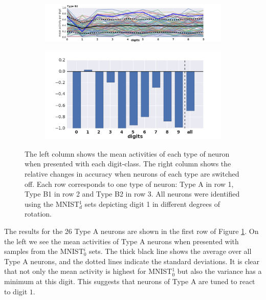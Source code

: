 \documentclass[10pt,a4paper]{article}
\begin{document}
\begin{figure}
\hfill
 \centering
\begin{subfigure}{.7\textwidth}
  \centering
  \includegraphics[width=1\linewidth]{activity_il_digit1_lay4_mnist.png}
\end{subfigure}%
\begin{subfigure}{.3\textwidth}
  \centering
  \includegraphics[width=1\linewidth]{rel_acc_dig1_lay4_typeB2.png}
\end{subfigure}
\caption{\footnotesize{The left column shows the mean activities of each type of neuron when presented with each digit-class. The right column shows the relative changes in accuracy when neurons of each type are switched off. Each row corresponds to one type of neuron: Type A in row 1, Type B1 in row 2 and Type B2 in row 3. All neurons were identified using the MNIST$_d^1$ sets depicting digit 1 in different degrees of rotation.}}
\label{fig:Special_neurons_layer4 }
\end{figure}


\noindent The results for the 26 Type A neurons are shown in the first row of Figure \ref{fig:Special_neurons_layer4 }. On the left we see the mean activities of Type A neurons when presented with samples from the MNIST$_0^i$ sets. The thick black line shows the average over all Type A neurons, and the dotted lines indicate the standard deviations. It is clear that not only the mean activity is highest for MNIST$_{0}^{1}$ but also the variance has a minimum at this digit. This suggests that neurons of Type A are tuned to react to digit $1$. \newline
\end{document}
